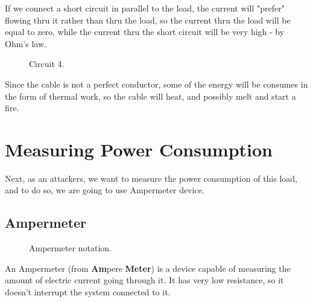 If we connect a short circuit in parallel to the load, the current will "prefer" flowing thru it rather than thru the load, so the current thru the load will be equal to zero, while the current thru the short circuit will be very high - by Ohm's law.
\begin{figure}
    \centering
    
    \caption{Circuit 4.} \label{fig:circuit4}
\end{figure}
Since the cable is not a perfect conductor, some of the energy will be consumes in the form of thermal work, so the cable will heat, and possibly melt and start a fire.
\section{Measuring Power Consumption}
Next, as an attackers, we want to measure the power consumption of this load, and to do so, we are going to use Ampermeter device.
\subsection{Ampermeter}
\begin{figure}
    \centering
    
    \caption{Ampermeter notation.} \label{fig:ampermeter}
\end{figure}
An Ampermeter (from \textbf{Am}pere \textbf{Meter}) is a device capable of measuring the amount of electric current going through it. It has very low resistance, so it doesn't interrupt the system connected to it.
